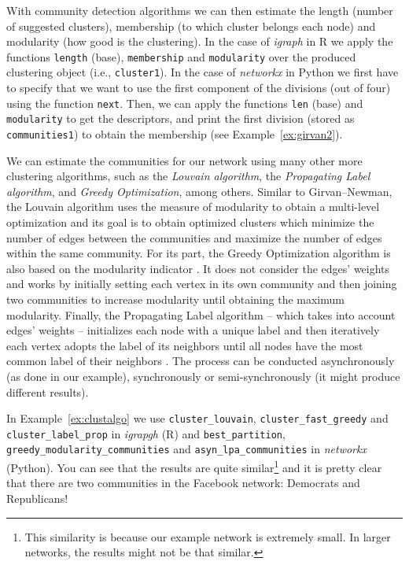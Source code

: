 With community detection algorithms we can then estimate the length (number of suggested clusters), membership (to which cluster belongs each node) and modularity (how good is the clustering). In the case of \emph{igraph} in R we apply the functions \texttt{length} (base), \texttt{membership} and \texttt{modularity} over the produced clustering object (i.e., \texttt{cluster1}). In the case of \emph{networkx} in Python we first have to specify that we want to use the first component of the divisions (out of four) using the function \texttt{next}. Then, we can apply the functions \texttt{len} (base) and \texttt{modularity} to get the descriptors, and print the first division (stored as \texttt{communities1}) to obtain the membership (see Example~\ref{ex:girvan2}).


We can estimate the communities for our network using many other more clustering algorithms, such as the \emph{Louvain algorithm}, the \emph{Propagating Label algorithm}, and \emph{Greedy Optimization}, among others. Similar to Girvan--Newman, the Louvain algorithm uses the measure of modularity to obtain a multi-level optimization \citep{blondel2008fast} and its goal is to obtain optimized clusters which minimize the number of edges between the communities and maximize the number of edges within the same community. For its part, the Greedy Optimization algorithm is also based on the modularity indicator \citep{clauset2004finding}. It does not consider the edges' weights and works by initially setting each vertex in its own community and then joining two communities to increase modularity until obtaining the maximum modularity. Finally, the Propagating Label algorithm -- which takes into account edges' weights -- initializes each node with a unique label and then iteratively each vertex adopts the label of its neighbors until all nodes have the most common label of their neighbors \citep{raghavan2007near}. The process can be conducted asynchronously (as done in our example), synchronously or semi-synchronously (it might produce different results).

In Example~\ref{ex:clustalgo} we use \texttt{cluster\_louvain}, \texttt{cluster\_fast\_greedy} and \texttt{cluster\_label\_prop} in \emph{igrapgh} (R) and \texttt{best\_partition}, \texttt{greedy\_modularity\_communities} and \texttt{asyn\_lpa\_communities} in \emph{networkx} (Python). You can see  that the results are quite similar\footnote{This similarity is because our example network is extremely small. In larger networks, the results might not be that similar.}  and it is pretty clear that there are two communities in the Facebook network: Democrats and Republicans!

